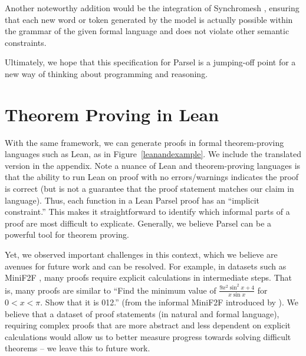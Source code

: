 Another noteworthy addition would be the integration of Synchromesh \citep{poesia2022synchromesh}, ensuring that each new word or token generated by the model is actually possible within the grammar of the given formal language and does not violate other semantic constraints.

Ultimately, we hope that this specification for Parsel is a jumping-off point for a new way of thinking about programming and reasoning.

\section{Theorem Proving in Lean}
\label{theoremproving}
With the same framework, we can generate proofs in formal theorem-proving languages such as Lean, as in Figure~\ref{leanandexample}.
We include the translated version in the appendix. Note a nuance of Lean and theorem-proving languages is that the ability to run Lean on proof with no errors/warnings indicates the proof is correct (but is not a guarantee that the proof statement matches our claim in language). Thus, each function in a Lean Parsel proof has an ``implicit constraint.'' This makes it straightforward to identify which informal parts of a proof are most difficult to explicate. Generally, we believe Parsel can be a powerful tool for theorem proving.

Yet, we observed important challenges in this context, which we believe are avenues for future work and can be resolved.
For example, in datasets such as MiniF2F \citep{zheng2021minif2f}, many proofs require explicit calculations in intermediate steps. That is, many proofs are similar to ``Find the minimum value of $\frac{9x^2\sin^2 x + 4}{x\sin x}$ for $0 < x < \pi$. Show that it is 012.'' (from the informal MiniF2F introduced by \citet{jiang2022draft}). 
We believe that a dataset of proof statements (in natural and formal language), requiring complex proofs that are more abstract and less dependent on explicit calculations would allow us to better measure progress towards solving difficult theorems -- we leave this to future work.

